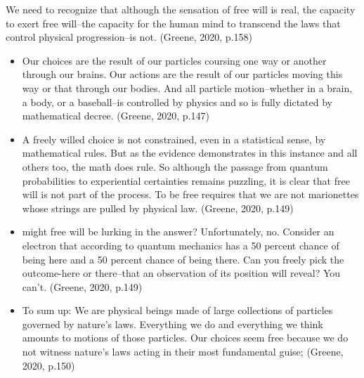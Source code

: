 \documentclass[11pt]{article}
\begin{document}
We need to recognize that although the sensation of free will is real, the capacity to exert free will--the capacity for the human mind to transcend the laws that control physical progression--is not.
(Greene, 2020, p.158)
\begin{itemize}
 \item {Our choices are the result of our particles coursing one way or another through our brains. Our actions are the result of our particles moving this way or that through our bodies. And all particle motion--whether in a brain, a body, or a baseball--is controlled by physics and so is fully dictated by mathematical decree. (Greene, 2020, p.147)
       }
       \item{
                   A freely willed choice is not constrained, even in a statistical sense, by mathematical rules. But as the evidence demonstrates in this instance and all others too, the math does rule. So although the passage from quantum probabilities to experiential certainties remains puzzling, it is clear that free will is not part of the process. To be free requires that we are not marionettes whose strings are pulled by physical law. (Greene, 2020, p.149)
             }
       \item{
                   might free will be lurking in the answer? Unfortunately, no. Consider an electron that according to quantum mechanics has a 50 percent chance of being here and a 50 percent chance of being there. Can you freely pick the outcome-here or there--that an observation of its position will reveal? You can't.
                   (Greene, 2020, p.149)
             }
 \item {
       To sum up: We are physical beings made of large collections of particles governed by nature's laws. Everything we do and everything we think amounts to motions of those particles.
       Our choices seem free because we do not witness nature's laws acting in their most fundamental guise;
       (Greene, 2020, p.150)
       
       
       
       }
\end{itemize}
\end{document}
